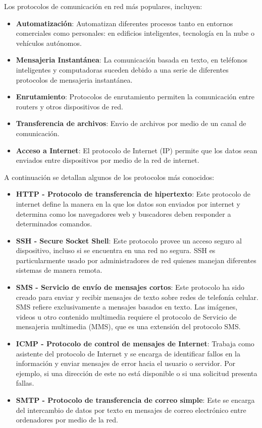Los protocolos de comunicación en red más populares, incluyen:

\begin{itemize}
    \item \textbf{Automatización}: Automatizan diferentes procesos tanto en entornos comerciales como personales: en edificios inteligentes, tecnología en la nube o vehículos autónomos.
    \item \textbf{Mensajeria Instantánea}: La comunicación basada en texto, en teléfonos inteligentes y computadoras suceden debido a una serie de diferentes protocolos de mensajeria instantánea.
    \item \textbf{Enrutamiento}: Protocolos de enrutamiento permiten la comunicación entre routers y otros dispositivos de red.
    \item \textbf{Transferencia de archivos}: Envio de archivos por medio de un canal de comunicación.
    \item \textbf{Acceso a Internet}: El protocolo de Internet (IP) permite que los datos sean enviados entre dispositivos por medio de la red de internet.
\end{itemize}

A continuación se detallan algunos de los protocolos más conocidos:
\begin{itemize}
    \item \textbf{HTTP - Protocolo de transferencia de hipertexto}: Este protocolo de internet define la manera en la que los datos son enviados por internet y determina como los navegadores web y buscadores deben responder a determinados comandos.
    \item \textbf{SSH - Secure Socket Shell}: Este protocolo provee un acceso seguro al dispositivo, incluso si se encuentra en una red no segura. SSH es particularmente usado por administradores de red quienes manejan diferentes sistemas de manera remota.
    \item \textbf{SMS - Servicio de envío de mensajes cortos}: Este protocolo ha sido creado para enviar y recibir mensajes de texto sobre redes de telefonía celular. SMS refiere exclusivamente a mensajes basados en texto. Las imágenes, videos u otro contenido multimedia requiere el protocolo de Servicio de mensajeria multimedia (MMS), que es una extensión del protocolo SMS.
    \item \textbf{ICMP - Protocolo de control de mensajes de Internet}: Trabaja como asistente del protocolo de Internet y se encarga de identificar fallos en la información y enviar mensajes de error hacia el usuario o servidor. Por ejemplo, si una dirección de este no está disponible o si una solicitud presenta fallas.
    \item \textbf{SMTP - Protocolo de transferencia de correo simple}: Este se encarga del intercambio de datos por texto en mensajes de correo electrónico entre ordenadores por medio de la red.
\end{itemize}

